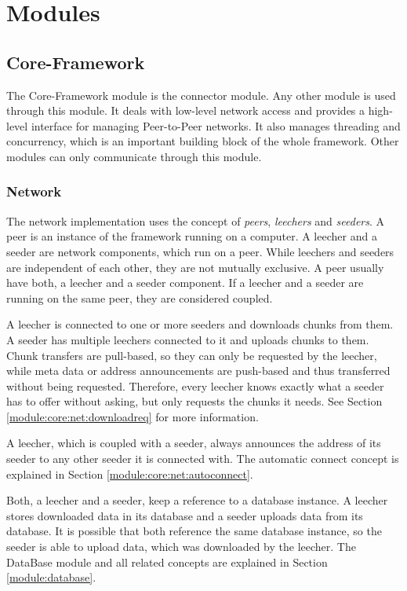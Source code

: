 
\chapter{Modules}
\label{module}

\section{Core-Framework}
\label{module:core}

The Core-Framework module is the connector module. Any other module is used through this module. It deals with low-level network access and provides a high-level interface for managing Peer-to-Peer networks. It also manages threading and concurrency, which is an important building block of the whole framework. Other modules can only communicate through this module.

\subsection{Network}
\label{module:core:net}
The network implementation uses the concept of \emph{peers}, \emph{leechers} and \emph{seeders}. A peer is an instance of the framework running on a computer. A leecher and a seeder are network components, which run on a peer. While leechers and seeders are independent of each other, they are not mutually exclusive. A peer usually have both, a leecher and a seeder component. If a leecher and a seeder are running on the same peer, they are considered coupled. 

A leecher is connected to one or more seeders and downloads chunks from them. A seeder has multiple leechers connected to it and uploads chunks to them. Chunk transfers are pull-based, so they can only be requested by the leecher, while meta data or address announcements are push-based and thus transferred without being requested. Therefore, every leecher knows exactly what a seeder has to offer without asking, but only requests the chunks it needs. See Section \ref{module:core:net:downloadreq} for more information.

A leecher, which is coupled with a seeder, always announces the address of its seeder to any other seeder it is connected with. The automatic connect concept is explained in Section \ref{module:core:net:autoconnect}.

Both, a leecher and a seeder, keep a reference to a database instance. A leecher stores downloaded data in its database and a seeder uploads data from its database. It is possible that both reference the same database instance, so the seeder is able to upload data, which was downloaded by the leecher. The DataBase module and all related concepts are explained in Section \ref{module:database}.

